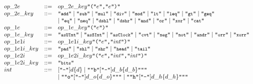 {\begin{figure}[htbp]
{\[\begin{array}{l l l}
op\_2e & ::= & op\_2e\_key \mbox{\tt ``(''}  e \mbox{\tt ``,''}  e \mbox{\tt ``)''} \\
%
op\_2e\_key & ::= &  \mbox{\tt ``\fnprettyll{add}''}  \mid  \mbox{\tt ``\fnprettyll{sub}''}  \mid \mbox{\tt ``\fnprettyll{mul}''} \mid \mbox{\tt ``\fnprettyll{div}''} \mid \mbox{\tt ``\fnprettyll{mod}''} \mid \mbox{\tt ``\fnprettyll{lt}''} \mid \mbox{\tt ``\fnprettyll{leq}''} \mid \mbox{\tt ``\fnprettyll{gt}''} \mid \mbox{\tt ``\fnprettyll{geq}''}\\
& &   \mid \mbox{\tt ``\fnprettyll{eq}''} \mid \mbox{\tt ``\fnprettyll{neq}''}  \mid \mbox{\tt ``\fnprettyll{dshl}''}  \mid \mbox{\tt ``\fnprettyll{dshr}''} \mid \mbox{\tt ``\fnprettyll{and}''} \mid \mbox{\tt ``\fnprettyll{or}''} \mid \mbox{\tt ``\fnprettyll{xor}''} \mid \mbox{\tt ``\fnprettyll{cat}''} \\
op\_1e & ::= & op\_1e\_key \mbox{\tt ``(''}  e \mbox{\tt ``)''} \\
op\_1e\_key & ::= & \mbox{\tt ``\fnprettyll{asUInt}''} \mid \mbox{\tt ``\fnprettyll{asSInt}''} \mid \mbox{\tt ``\fnprettyll{asClock}''} \mid \mbox{\tt ``\fnprettyll{cvt}''} \mid \mbox{\tt ``\fnprettyll{neg}''} \mid \mbox{\tt ``\fnprettyll{not}''}  \mid \mbox{\tt ``\fnprettyll{andr}''} \mid \mbox{\tt ``\fnprettyll{orr}''} \mid  \mbox{\tt ``\fnprettyll{xorr}''}\\
%
op\_1e1i & ::= & op\_1e1i\_key \mbox{\tt ``(''}  e \mbox{\tt ``,''} int \mbox{\tt ``)''} \\
op\_1e1i\_key & ::= & \mbox{\tt ``\fnprettyll{pad}''} \mid \mbox{\tt ``\fnprettyll{shl}''} \mid \mbox{\tt ``\fnprettyll{shr}''} \mid \mbox{\tt ``\fnprettyll{head}''} \mid \mbox{\tt ``\fnprettyll{tail}''} \\
op\_1e2i & ::= & op\_1e2i\_key \mbox{\tt ``(''}  e \mbox{\tt ``,''}  int  \mbox{\tt ``,''}  int \mbox{\tt ``)''} \\
op\_1e2i\_key & ::= & \mbox{\tt ``\fnprettyll{bits}''}\\
%
int & ::= & [\mbox{\tt ``-''}] d \{d\} \mid \mbox{\tt ``"b''} [\mbox{\tt ``-''}] d\_b \{d\_b\} \mbox{\tt ``"''} \\
& & \mid \mbox{\tt ``"o''} [\mbox{\tt ``-''}] d\_o \{d\_o\} \mbox{\tt ``"''} \mid
\mbox{\tt ``"h''} [\mbox{\tt ``-''}] d\_h \{d\_h\} \mbox{\tt ``"''} \\
%

\end{array}\]}
\end{figure}}
